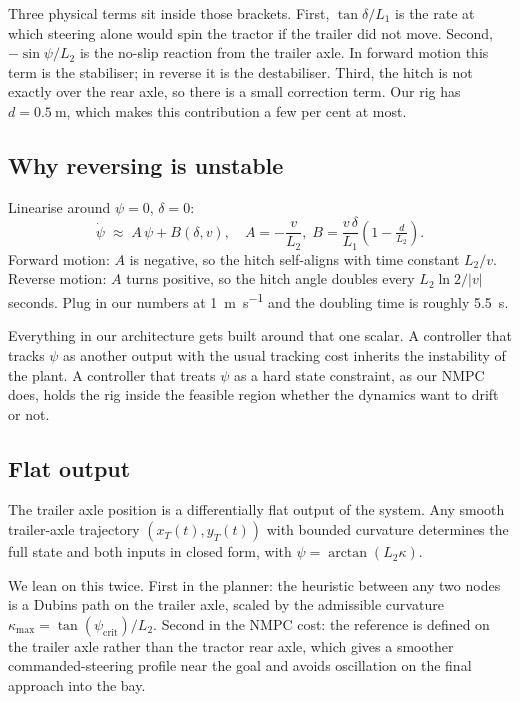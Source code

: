 \documentclass[conference]{IEEEtran}
\begin{document}
Three physical terms sit inside those brackets. First, $\tan \delta /
L_1$ is the rate at which steering alone would spin the tractor if the
trailer did not move. Second, $-\sin \psi / L_2$ is the no-slip reaction
from the trailer axle. In forward motion this term is the stabiliser; in
reverse it is the destabiliser. Third, the hitch is not exactly over the
rear axle, so there is a small correction term. Our rig has $d =
\SI{0.5}{\meter}$, which makes this contribution a few per cent at most.

\subsection{Why reversing is unstable}

Linearise around $\psi = 0$, $\delta = 0$:
\begin{equation}
    \dot{\psi} \;\approx\; A\, \psi + B(\delta,v), \quad A = -\frac{v}{L_2},\;
    B = \frac{v\,\delta}{L_1}\!\left(1 - \tfrac{d}{L_2}\right).
    \label{eq:linearised}
\end{equation}
Forward motion: $A$ is negative, so the hitch self-aligns with time
constant $L_2 / v$. Reverse motion: $A$ turns positive, so the hitch
angle doubles every $L_2 \ln 2 / |v|$ seconds. Plug in our numbers at
\SI{1}{\meter\per\second} and the doubling time is roughly
\SI{5.5}{\second}.

Everything in our architecture gets built around that one scalar. A
controller that tracks $\psi$ as another output with the usual tracking
cost inherits the instability of the plant. A controller that treats
$\psi$ as a hard state constraint, as our NMPC does, holds the rig inside
the feasible region whether the dynamics want to drift or not.

\subsection{Flat output}

The trailer axle position is a differentially flat output of the
system. Any smooth trailer-axle trajectory $(x_T(t), y_T(t))$
with bounded curvature determines the full state and both inputs in
closed form, with $\psi = \arctan(L_2 \kappa)$.

We lean on this twice. First in the planner: the heuristic between any
two nodes is a Dubins path on the trailer axle, scaled by the admissible
curvature $\kappa_{\max} = \tan(\psi_{\mathrm{crit}})/L_2$. Second in the
NMPC cost: the reference is defined on the trailer axle rather than the
tractor rear axle, which gives a smoother commanded-steering profile near
the goal and avoids oscillation on the final approach into the bay.
\end{document}
